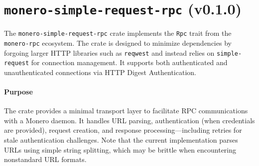 \documentclass[12pt,a4paper]{article}
\begin{document}



\section{\texttt{monero-simple-request-rpc} (v0.1.0)}
The \texttt{monero-simple-request-rpc} crate implements the \texttt{Rpc} trait from the \texttt{monero-rpc} ecosystem. The crate is designed to minimize dependencies by forgoing larger HTTP libraries such as \texttt{reqwest} and instead relies on \texttt{simple-request} for connection management. It supports both authenticated and unauthenticated connections via HTTP Digest Authentication.

\paragraph{Purpose}
The crate provides a minimal transport layer to facilitate RPC communications with a Monero daemon. It handles URL parsing, authentication (when credentials are provided), request creation, and response processing—including retries for stale authentication challenges. Note that the current implementation parses URLs using simple string splitting, which may be brittle when encountering nonstandard URL formats.
\end{document}
